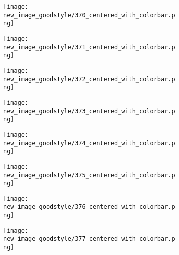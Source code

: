 \documentclass[a4paper,12pt]{article}
\begin{document}
\begin{figure}[H]
  \begin{subfigure}{0.11\textwidth}
    \texttt{[image: new\_image\_goodstyle/370\_centered\_with\_colorbar.png]}
  \end{subfigure}
  \hfill
  \begin{subfigure}{0.11\textwidth}
    \texttt{[image: new\_image\_goodstyle/371\_centered\_with\_colorbar.png]}
  \end{subfigure}
  \hfill
  \begin{subfigure}{0.11\textwidth}
    \texttt{[image: new\_image\_goodstyle/372\_centered\_with\_colorbar.png]}
  \end{subfigure}
  \hfill
  \begin{subfigure}{0.11\textwidth}
    \texttt{[image: new\_image\_goodstyle/373\_centered\_with\_colorbar.png]}
  \end{subfigure}
  \hfill
  \begin{subfigure}{0.11\textwidth}
    \texttt{[image: new\_image\_goodstyle/374\_centered\_with\_colorbar.png]}
  \end{subfigure}
  \hfill
  \begin{subfigure}{0.11\textwidth}
    \texttt{[image: new\_image\_goodstyle/375\_centered\_with\_colorbar.png]}
  \end{subfigure}
  \hfill
  \begin{subfigure}{0.11\textwidth}
    \texttt{[image: new\_image\_goodstyle/376\_centered\_with\_colorbar.png]}
  \end{subfigure}
  \hfill
  \begin{subfigure}{0.11\textwidth}
    \texttt{[image: new\_image\_goodstyle/377\_centered\_with\_colorbar.png]}
  \end{subfigure}
  \hfill
\end{figure}
\end{document}
